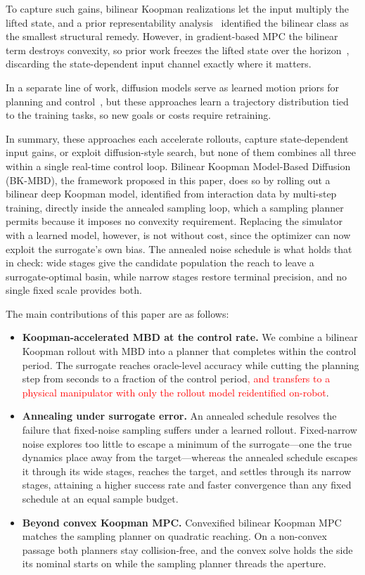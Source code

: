 \documentclass[letterpaper,10pt,conference]{ieeeconf}
\newcommand{\nd}[1]{\textcolor{red}{#1}}
\newcommand{\bkmbd}{\textsc{BK-MBD}}
\begin{document}
To capture such gains, bilinear Koopman realizations let the input multiply the lifted state, and a prior representability analysis~\cite{kim2026bilinear} identified the bilinear class as the smallest structural remedy.
However, in gradient-based MPC the bilinear term destroys convexity, so prior work freezes the lifted state over the horizon~\cite{bruder2021bilinear}, discarding the state-dependent input channel exactly where it matters.

In a separate line of work, diffusion models serve as learned motion priors for planning and control~\cite{janner2022planning, chi2025diffusion, carvalho2023motion}, but these approaches learn a trajectory distribution tied to the training tasks, so new goals or costs require retraining.

In summary, these approaches each accelerate rollouts, capture state-dependent input gains, or exploit diffusion-style search, but none of them combines all three within a single real-time control loop.
Bilinear Koopman Model-Based Diffusion (\bkmbd{}), the framework proposed in this paper, does so by rolling out a bilinear deep Koopman model, identified from interaction data by multi-step training, directly inside the annealed sampling loop, which a sampling planner permits because it imposes no convexity requirement.
Replacing the simulator with a learned model, however, is not without cost, since the optimizer can now exploit the surrogate's own bias.
The annealed noise schedule is what holds that in check: wide stages give the candidate population the reach to leave a surrogate-optimal basin, while narrow stages restore terminal precision, and no single fixed scale provides both.

The main contributions of this paper are as follows:
\begin{itemize}
\item \textbf{Koopman-accelerated MBD at the control rate.}
We combine a bilinear Koopman rollout with MBD into a planner that completes within the control period. The surrogate reaches oracle-level accuracy while cutting the planning step from seconds to a fraction of the control period\nd{, and transfers to a physical manipulator with only the rollout model reidentified on-robot}.
\item \textbf{Annealing under surrogate error.}
An annealed schedule resolves the failure that fixed-noise sampling suffers under a learned rollout. Fixed-narrow noise explores too little to escape a minimum of the surrogate---one the true dynamics place away from the target---whereas the annealed schedule escapes it through its wide stages, reaches the target, and settles through its narrow stages, attaining a higher success rate and faster convergence than any fixed schedule at an equal sample budget.
\item \textbf{Beyond convex Koopman MPC.}
Convexified bilinear Koopman MPC matches the sampling planner on quadratic reaching. On a non-convex passage both planners stay collision-free, and the convex solve holds the side its nominal starts on while the sampling planner threads the aperture.
\end{itemize}
\end{document}
